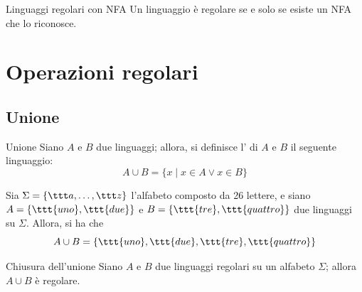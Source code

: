 \documentclass[a4paper, 12pt]{report}
\begin{document}
    \begin{framedcor}[label={nfa regolare}]{Linguaggi regolari con NFA}
        Un linguaggio è regolare se e solo se esiste un NFA che lo riconosce.
    \end{framedcor}


    \section{Operazioni regolari}

    \subsection{Unione}
    
    \begin{frameddefn}{Unione}
        Siano $A$ e $B$ due linguaggi; allora, si definisce l' di $A$ e $B$ il seguente linguaggio: $$A \cup B = \{x \mid x \in A \lor x \in B \}$$
    \end{frameddefn}

    \begin{example}[Unione]
        Sia $\Sigma = \{\ttt a , \ldots, \ttt z\}$ l'alfabeto composto da 26 lettere, e siano $A = \{\ttt{uno}, \ttt{due}\}$ e $B = \{\ttt{tre}, \ttt{quattro}\}$ due linguaggi su $\Sigma$. Allora, si ha che $$A \cup B = \{\ttt{uno}, \ttt{due}, \ttt{tre}, \ttt{quattro}\}$$
    \end{example}

    \begin{framedprop}[label={closure unione}]{Chiusura dell'unione}
        Siano $A$ e $B$ due linguaggi regolari su un alfabeto $\Sigma$; allora $A \cup B$ è regolare.
    \end{framedprop}
\end{document}
